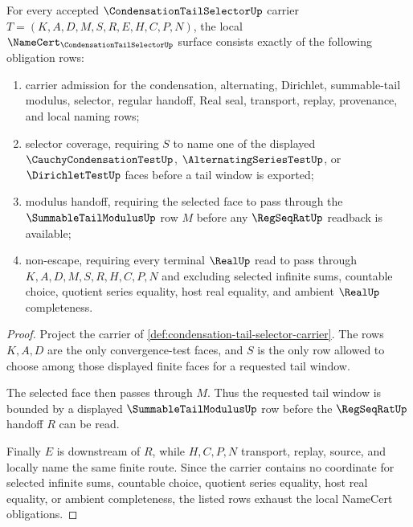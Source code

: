\begin{theorem}
\label{thm:condensation-tail-selector-namecert-obligations}
For every accepted $\CondensationTailSelectorUp$ carrier $T=(K,A,D,M,S,R,E,H,C,P,N)$, the local $\NameCert_{\CondensationTailSelectorUp}$ surface consists exactly of the following obligation rows:
\begin{enumerate}
\item carrier admission for the condensation, alternating, Dirichlet, summable-tail modulus, selector, regular handoff, Real seal, transport, replay, provenance, and local naming rows;
\item selector coverage, requiring $S$ to name one of the displayed $\CauchyCondensationTestUp$, $\AlternatingSeriesTestUp$, or $\DirichletTestUp$ faces before a tail window is exported;
\item modulus handoff, requiring the selected face to pass through the $\SummableTailModulusUp$ row $M$ before any $\RegSeqRatUp$ readback is available;
\item non-escape, requiring every terminal $\RealUp$ read to pass through $K,A,D,M,S,R,H,C,P,N$ and excluding selected infinite sums, countable choice, quotient series equality, host real equality, and ambient $\RealUp$ completeness.
\end{enumerate}
\end{theorem}
\begin{proof}
Project the carrier of \autoref{def:condensation-tail-selector-carrier}. The rows $K,A,D$ are the only convergence-test faces, and $S$ is the only row allowed to choose among those displayed finite faces for a requested tail window.

The selected face then passes through $M$. Thus the requested tail window is bounded by a displayed $\SummableTailModulusUp$ row before the $\RegSeqRatUp$ handoff $R$ can be read.

Finally $E$ is downstream of $R$, while $H,C,P,N$ transport, replay, source, and locally name the same finite route. Since the carrier contains no coordinate for selected infinite sums, countable choice, quotient series equality, host real equality, or ambient completeness, the listed rows exhaust the local NameCert obligations.
\end{proof}

